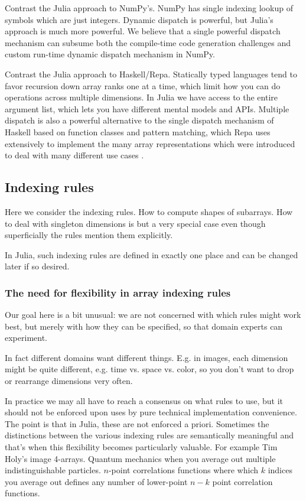 \documentclass[preprint]{sigplanconf}
\begin{document}
Contrast the Julia approach to NumPy's. NumPy has single indexing lookup of
symbols which are just integers. Dynamic dispatch is powerful, but Julia's
approach is much more powerful. We believe that a single powerful dispatch
mechanism can subsume both the compile-time code generation challenges and
custom run-time dynamic dispatch mechanism in NumPy.

Contrast the Julia approach to Haskell/Repa. Statically typed languages tend
to favor recursion down array ranks one at a time, which limit how you can do
operations across multiple dimensions. In Julia we have access to the entire
argument list, which lets you have different mental models and APIs.
Multiple dispatch is also a powerful alternative to the single dispatch
mechanism of Haskell based on function classes and pattern matching, which Repa
uses extensively to implement the many array representations which were
introduced to deal with many different use cases
\cite{Lippmeier:2011ep,Lippmeier:2012gp}.

\subsection{Indexing rules}

Here we consider the indexing rules. How to compute shapes of subarrays. How
to deal with singleton dimensions is but a very special case even though
superficially the rules mention them explicitly.

In Julia, such indexing rules are defined in exactly one place and can be
changed later if so desired.

\subsubsection{The need for flexibility in array indexing rules}

Our goal here is a bit unusual: we are not concerned with which rules might
work best, but merely with how they can be specified, so that domain experts
can experiment.

In fact different domains want different things. E.g. in images, each
dimension might be quite different, e.g. time vs. space vs. color, so you
don't want to drop or rearrange dimensions very often.

In practice we may all have to reach a consensus on what rules to use, but it
should not be enforced upon uses by pure technical implementation convenience.
The point is that in Julia, these are not enforced a priori. Sometimes the
distinctions between the various indexing rules are semantically meaningful
and that's when this flexibility becomes particularly valuable. For example
Tim Holy's image 4-arrays. Quantum mechanics when you average out multiple
indistinguishable particles. $n$-point correlations functions where which $k$
indices you average out defines any number of lower-point $n-k$ point
correlation functions.
\end{document}
